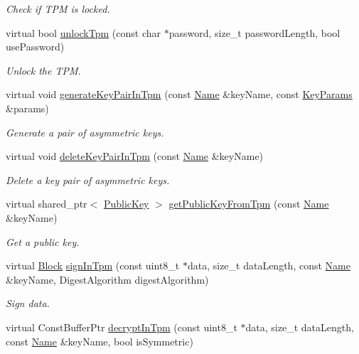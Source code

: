 \begin{DoxyCompactItemize}
\begin{DoxyCompactList}\small\item\em Check if T\+PM is locked. \end{DoxyCompactList}\item 
virtual bool \hyperlink{classndn_1_1SecTpmFile_ab9eb717a43f2a58c120d55e85ae023c2}{unlock\+Tpm} (const char $\ast$password, size\+\_\+t password\+Length, bool use\+Password)
\begin{DoxyCompactList}\small\item\em Unlock the T\+PM. \end{DoxyCompactList}\item 
virtual void \hyperlink{classndn_1_1SecTpmFile_ab97ec69d98598f394b644bd1eec2f0ba}{generate\+Key\+Pair\+In\+Tpm} (const \hyperlink{classndn_1_1Name}{Name} \&key\+Name, const \hyperlink{classndn_1_1KeyParams}{Key\+Params} \&params)
\begin{DoxyCompactList}\small\item\em Generate a pair of asymmetric keys. \end{DoxyCompactList}\item 
virtual void \hyperlink{classndn_1_1SecTpmFile_a892dc8d2d5ae781db9d201d89c1c2e92}{delete\+Key\+Pair\+In\+Tpm} (const \hyperlink{classndn_1_1Name}{Name} \&key\+Name)
\begin{DoxyCompactList}\small\item\em Delete a key pair of asymmetric keys. \end{DoxyCompactList}\item 
virtual shared\+\_\+ptr$<$ \hyperlink{classndn_1_1PublicKey}{Public\+Key} $>$ \hyperlink{classndn_1_1SecTpmFile_a03db7dbd71f1de2d3dd007a6ac9ae9d9}{get\+Public\+Key\+From\+Tpm} (const \hyperlink{classndn_1_1Name}{Name} \&key\+Name)
\begin{DoxyCompactList}\small\item\em Get a public key. \end{DoxyCompactList}\item 
virtual \hyperlink{classndn_1_1Block}{Block} \hyperlink{classndn_1_1SecTpmFile_a5c0bb1c159f59b17b0b1e1b2255716bd}{sign\+In\+Tpm} (const uint8\+\_\+t $\ast$data, size\+\_\+t data\+Length, const \hyperlink{classndn_1_1Name}{Name} \&key\+Name, Digest\+Algorithm digest\+Algorithm)
\begin{DoxyCompactList}\small\item\em Sign data. \end{DoxyCompactList}\item 
virtual Const\+Buffer\+Ptr \hyperlink{classndn_1_1SecTpmFile_afe5abf95ece3735d4e4ebc9318d43e32}{decrypt\+In\+Tpm} (const uint8\+\_\+t $\ast$data, size\+\_\+t data\+Length, const \hyperlink{classndn_1_1Name}{Name} \&key\+Name, bool is\+Symmetric)

\end{DoxyCompactItemize}

